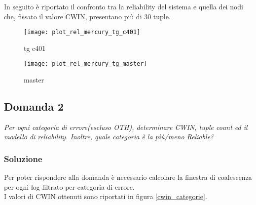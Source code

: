 In seguito è riportato il confronto tra la reliability del sistema e quella dei
nodi che, fissato il valore CWIN, presentano più di 30 tuple.\\

\begin{minipage}{\linewidth}
  \centering
  \begin{minipage}{.49\linewidth}
    \begin{figure}[H]
      \texttt{[image: plot\_rel\_mercury\_tg\_c401]}
      \caption*{tg c401}
    \end{figure}
  \end{minipage}
  \begin{minipage}{.49\linewidth}
    \begin{figure}[H]
      \texttt{[image: plot\_rel\_mercury\_tg\_master]}
      \caption*{master}
    \end{figure}
  \end{minipage}
\end{minipage}

\clearpage

\subsection{Domanda 2}
\textit{Per ogni categoria di errore(escluso OTH), determinare CWIN, tuple count
ed il modello di reliability.
Inoltre, quale categoria è la pìù/meno Reliable?}

\subsubsection*{Soluzione}
Per poter rispondere alla domanda è necessario calcolare la finestra di coalescenza
per ogni log filtrato per categoria di errore.\\
I valori di CWIN ottenuti sono riportati in figura \ref{cwin_categorie}.\\

